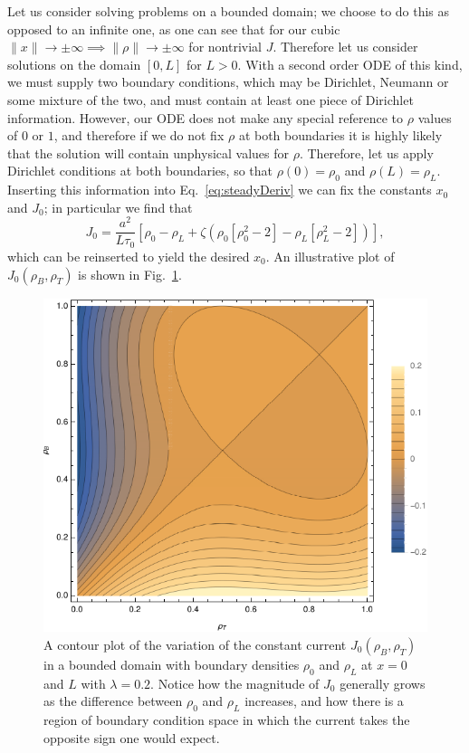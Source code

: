 Let us consider solving problems on a bounded domain; we choose to do this as opposed to an infinite one, as one can see that for our cubic $ \|x\|  \rightarrow \pm \infty \implies \|\rho\|  \rightarrow \pm \infty$ for nontrivial $J$.
Therefore let us consider solutions on the domain $[0, L]$ for $L>0$. With a second order ODE of this kind, we must supply two boundary conditions, which may be Dirichlet, Neumann or some mixture of the two,
and must contain at least one piece of Dirichlet information. However, our ODE does not make any special reference to $\rho$ values of $0$ or $1$, and therefore if we do not fix $\rho$ at both boundaries it is highly likely that the solution will contain
unphysical values for $\rho$. Therefore, let us apply Dirichlet conditions at both boundaries, so that $\rho(0) = \rho_0$ and $\rho(L) = \rho_L$. Inserting this information into Eq.~\ref{eq:steadyDeriv} we can fix the constants
$x_0$ and $J_0$; in particular we find that
\begin{equation}
\label{eq:blockFlow}
  J_0 = \frac{a^2}{L \tau_0} \left[ \rho_0 - \rho_L + \zeta \left( \rho_0\left[\rho_0^2-2\right] - \rho_L\left[\rho_L^2-2\right] \right) \right],
\end{equation}
which can be reinserted to yield the desired $x_0$. An illustrative plot of $J_0(\rho_B, \rho_T)$ is shown in Fig.~\ref{fig:boundaryCurrent}.
\begin{figure}[h!]
 \caption[The variation in the current at fixed $\lambda$ with respect to the boundary densities.]{\label{fig:boundaryCurrent} A contour plot of the variation of the constant current $J_0(\rho_B, \rho_T)$ in a bounded domain with boundary densities $\rho_0$ and $\rho_L$ at $x=0$ and $L$  with $\lambda=0.2$.
 Notice how the magnitude of $J_0$ generally grows as the difference between $\rho_0$ and $\rho_L$ increases, and how there is a region of boundary condition space in which the current takes the opposite sign one would expect.}
 \includegraphics[width=0.99\linewidth]{analytics/images/boundaryCurrent}
\end{figure}


